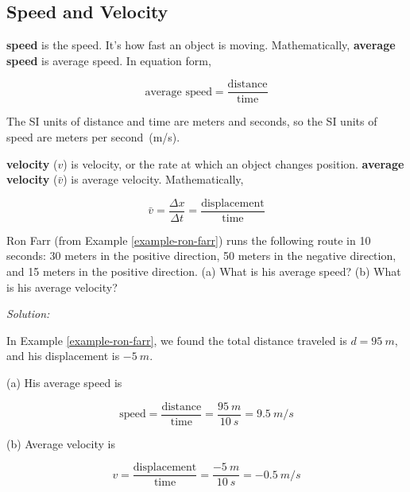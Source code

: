 \documentclass[dvipsnames]{article}
\begin{document}
\subsection{Speed and Velocity}

\textbf{\Gls{speed}} is the \glsdesc{speed}. It's how fast an object is moving. Mathematically, \textbf{\gls{average speed}} is \glsdesc{average speed}. In equation form,

\begin{equation}
    \text{average speed} = \frac{\mathrm{distance}}{\mathrm{time}}
\end{equation}

The SI units of distance and time are meters and seconds, so the SI units of speed are meters per second~(m/s).

\textbf{\Gls{velocity}} ($v$) is \glsdesc{velocity}, or the rate at which an object changes position. \textbf{\Gls{average velocity}} ($\bar{v}$) is \glsdesc{average velocity}. Mathematically, 

\begin{equation} \label{average-velocity}
    \bar{v} = \frac{\Delta x}{\Delta t} = \frac{\mathrm{displacement}}{\mathrm{time}}
\end{equation}

\begin{example}
    Ron Farr (from Example \ref{example-ron-farr}) runs the following route in 10 seconds: 30 meters in the positive direction, 50 meters in the negative direction, and 15 meters in the positive direction. (a) What is his average speed? (b) What is his average velocity?
\end{example}

\textit{Solution:}

In Example \ref{example-ron-farr}, we found the total distance traveled is $d = \SI{95}{m}$, and his displacement is $\SI{-5}{m}$.

(a) His average speed is

\begin{equation*}
    \text{speed} = \frac{\text{distance}}{\text{time}} = \frac{\SI{95}{m}}{\SI{10}{s}} = \boxed{\SI{9.5}{m/s}}
\end{equation*}

(b) Average velocity is

\begin{equation*}
    v = \frac{\text{displacement}}{\text{time}} = \frac{\SI{-5}{m}}{\SI{10}{s}} = \boxed{\SI{-0.5}{m/s}}
\end{equation*}
\end{document}
